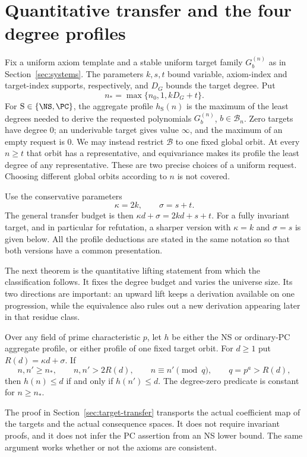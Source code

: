 \section{Quantitative transfer and the four degree profiles}\label{sec:classification}
Fix a uniform axiom template and a stable uniform target family
$G_b^{(n)}$ as in Section~\ref{sec:systems}. The parameters $k,s,t$ bound
variable, axiom-index and target-index supports, respectively, and $D_G$
bounds the target degree. Put
\[
                 n_* = \max\{n_0,1,kD_G+t\}.
\]
For $\mathrm S\in\{\NS,\PC\}$, the aggregate profile $h_{\mathrm S}(n)$
is the maximum of the least degrees needed to derive the requested
polynomials $G_b^{(n)}$, $b\in\mathcal B_n$. Zero targets have degree $0$;
an underivable target gives value $\infty$, and the maximum of an empty
request is $0$. We may instead
restrict $\mathcal B$ to one fixed global orbit. At every $n\ge t$ that
orbit has a representative, and equivariance makes its profile the least
degree of any representative. These are two precise choices of a uniform
request. Choosing different global orbits according to $n$ is not covered.

Use the conservative parameters
\begin{equation}\label{eq:profile-parameters}
                      \kappa=2k,\qquad \sigma=s+t.
\end{equation}
The general transfer budget is then $\kappa d+\sigma=2kd+s+t$.
For a fully invariant target, and in particular for refutation, a sharper
version with $\kappa=k$ and $\sigma=s$ is given below. All the profile
deductions are stated in the same notation so that both versions have a
common presentation.

The next theorem is the quantitative lifting statement from which
the classification follows. It fixes the degree budget and varies the
universe size. Its two directions are important: an upward lift keeps
a derivation available on one progression, while the equivalence also
rules out a new derivation appearing later in that residue class.

\begin{theorem}\label{thm:periodicity}
Over any field of prime characteristic $p$, let $h$ be either the NS or
ordinary-PC aggregate profile, or either profile of one fixed target
orbit. For $d\ge1$ put $R(d)=\kappa d+\sigma$. If
\[
 n,n'\ge n_*,\qquad n,n'>2R(d),\qquad
 n\equiv n'\pmod q,\qquad q=p^a>R(d),
\]
then $h(n)\le d$ if and only if $h(n')\le d$. The degree-zero predicate
is constant for $n\ge n_*$.
\end{theorem}
The proof in Section~\ref{sec:target-transfer} transports the actual
coefficient map of the targets and the actual consequence spaces. It does
not require invariant proofs, and it does not infer the PC assertion from
an NS lower bound. The same argument works whether or not the axioms are
consistent.

